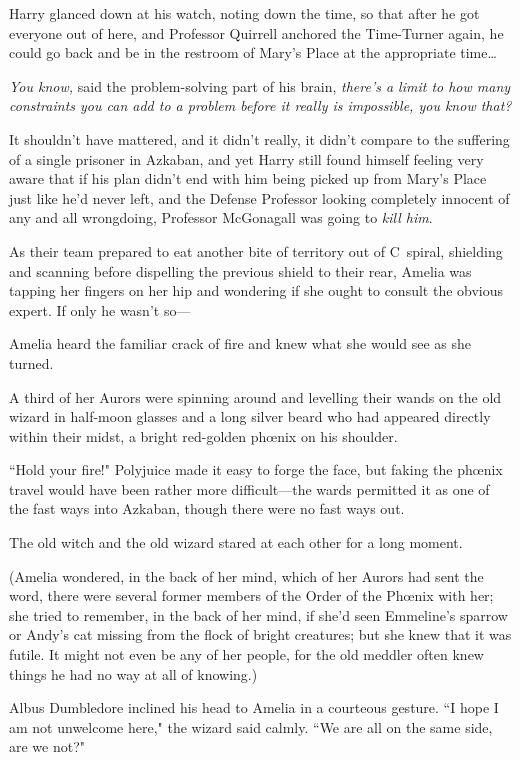 Harry glanced down at his watch, noting down the time, so that after he got everyone out of here, and Professor Quirrell anchored the Time-Turner again, he could go back and be in the restroom of Mary's Place at the appropriate time{\ldots}

\emph{You know,} said the problem-solving part of his brain, \emph{there's a limit to how many constraints you can add to a problem before it \emph{really is} impossible, you know that?}

It shouldn't have mattered, and it didn't really, it didn't compare to the suffering of a single prisoner in Azkaban, and yet Harry still found himself feeling very aware that if his plan didn't end with him being picked up from Mary's Place just like he'd never left, and the Defense Professor looking completely innocent of any and all wrongdoing, Professor McGonagall was going to \emph{kill him}.

\later

As their team prepared to eat another bite of territory out of C~spiral, shielding and scanning before dispelling the previous shield to their rear, Amelia was tapping her fingers on her hip and wondering if she ought to consult the obvious expert. If only he wasn't so—

Amelia heard the familiar crack of fire and knew what she would see as she turned.

A third of her Aurors were spinning around and levelling their wands on the old wizard in half-moon glasses and a long silver beard who had appeared directly within their midst, a bright red-golden phœnix on his shoulder.

``Hold your fire!" Polyjuice made it easy to forge the face, but faking the phœnix travel would have been rather more difficult—the wards permitted it as one of the fast ways into Azkaban, though there were no fast ways out.

The old witch and the old wizard stared at each other for a long moment.

(Amelia wondered, in the back of her mind, which of her Aurors had sent the word, there were several former members of the Order of the Phœnix with her; she tried to remember, in the back of her mind, if she'd seen Emmeline's sparrow or Andy's cat missing from the flock of bright creatures; but she knew that it was futile. It might not even be any of her people, for the old meddler often knew things he had no way at all of knowing.)

Albus Dumbledore inclined his head to Amelia in a courteous gesture. ``I hope I am not unwelcome here," the wizard said calmly. ``We are all on the same side, are we not?"

